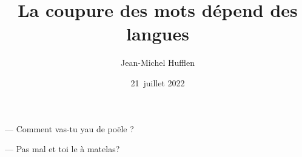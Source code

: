 \documentclass{article}
\title{La coupure des mots dépend des langues}
\author{Jean-Michel Hufflen}
\date{21~juillet 2022}
\begin{document}
\maketitle

--- Comment vas-tu yau de poële ?

--- Pas mal et toi le à matelas?



\end{document}
